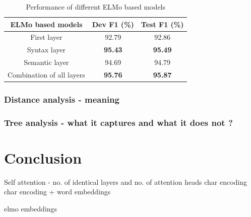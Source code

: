 \documentclass[a4paper, 11pt]{article}
\begin{document}
\begin{table}[h!]
  \begin{center}
    \label{tab:table1}
    \def\arraystretch{1.5}%
    \begin{tabular}{c|c|c}
      ELMo based models & Dev F1 (\%) & Test F1 (\%) \\
      \hline
	  First layer & 92.79 & 92.86\\
      Syntax layer  & \textbf{95.43} & \textbf{95.49}\\
      Semantic layer & 94.69 & 94.79\\
      Combination of all layers & \textbf{95.76} & \textbf{95.87}\\     
    \end{tabular}
    \caption{Performance of different ELMo based models}
  \end{center}
\end{table}


\subsubsection{Distance analysis - meaning}


\subsubsection{Tree analysis - what it captures and what it does not ?}


\pagebreak
\section{Conclusion}

Self attention - no. of identical layers and no. of attention heads
char encoding
char encoding + word embeddings

elmo embeddings
 

\newpage
\printbibliography
%
\end{document}
